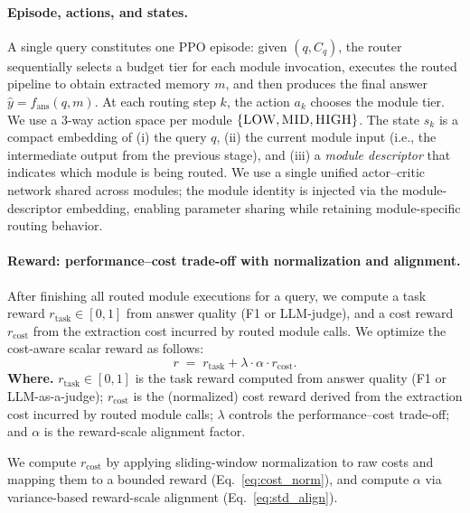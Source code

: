 \paragraph{Episode, actions, and states.}
A single query constitutes one PPO episode: given $(q, C_q)$, the router sequentially selects a budget tier for each module invocation, executes the routed pipeline to obtain extracted memory $m$, and then produces the final answer $\hat{y}=f_{\text{ans}}(q,m)$.
At each routing step $k$, the action $a_k$ chooses the module tier. We use a 3-way action space per module
$\{\textsc{LOW}, \textsc{MID}, \textsc{HIGH} \}$.
The state $s_k$ is a compact embedding of (i) the query $q$, (ii) the current module input (i.e., the intermediate output from the previous stage), and (iii) a \emph{module descriptor} that indicates which module is being routed.
We use a single unified actor--critic network shared across modules; the module identity is injected via the module-descriptor embedding, enabling parameter sharing while retaining module-specific routing behavior.

\paragraph{Reward: performance--cost trade-off with normalization and alignment.}
After finishing all routed module executions for a query, we compute a task reward $r_{\text{task}}\in[0,1]$ from answer quality (F1 or LLM-judge), and a cost reward $r_{\text{cost}}$ from the extraction cost incurred by routed module calls.
We optimize the cost-aware scalar reward as follows:
\begin{equation}
r \;=\; r_{\text{task}} + \lambda \cdot \alpha \cdot r_{\text{cost}}.
\label{eq:ppo_reward}
\end{equation}
\noindent\textbf{Where.} $r_{\text{task}}\in[0,1]$ is the task reward computed from answer quality (F1 or LLM-as-a-judge); $r_{\text{cost}}$ is the (normalized) cost reward derived from the extraction cost incurred by routed module calls; $\lambda$ controls the performance--cost trade-off; and $\alpha$ is the reward-scale alignment factor.

We compute $r_{\text{cost}}$ by applying sliding-window normalization to raw costs and mapping them to a bounded reward (Eq.~\ref{eq:cost_norm}),
and compute $\alpha$ via variance-based reward-scale alignment (Eq.~\ref{eq:std_align}).

